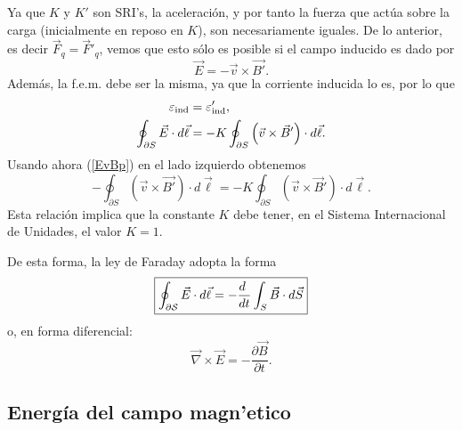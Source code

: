  Ya que $K$ y $K'$ son SRI's, la aceleración, y por tanto la fuerza que actúa sobre la carga (inicialmente en reposo en $K$), son necesariamente iguales. De lo anterior, es decir $\vec{F}_q=\vec{F}'_q$, vemos que esto sólo es posible si el campo inducido es dado por
 \begin{equation}\label{EvBp}
\vec{E}=-\vec{v}\times\vec{B'}.
\end{equation}
Además, la f.e.m. debe ser la misma, ya que la corriente inducida lo es, por lo que
\begin{align}
\varepsilon_{\rm ind} &= \varepsilon'_{\rm ind}, \\
\oint_{\partial S}\vec{E}\cdot d\vec{\ell} &=-K\oint_{\partial S}\left(\vec{v}\times\vec{B}'\right)\cdot d\vec{\ell}.
\end{align}
Usando ahora (\ref{EvBp}) en el lado izquierdo obtenemos
\begin{equation}
-\oint_{\partial S}\left(\vec{v}\times\vec{B'}\right)\cdot d\vec{\ell} =-K\oint_{\partial S}\left(\vec{v}\times\vec{B}'\right)\cdot d\vec{\ell}.
\end{equation}
Esta relación implica que la constante $K$ debe tener, en el Sistema Internacional de Unidades, el valor $K=1$. 

De esta forma, la ley de Faraday adopta la forma
\begin{equation}
\boxed{\oint_{\cal\partial S}\vec{E}\cdot d\vec{\ell}=-\frac{d\ }{dt}\int_S\vec{B}\cdot
d\vec{S}}
\end{equation}
o, en forma diferencial:
\begin{equation}
\boxed{\vec\nabla\times\vec{E}=-\frac{\partial\vec{B}}{\partial t}.}
\label{ley-faraday}
\end{equation}



\subsection{Energía del campo magn'etico}

